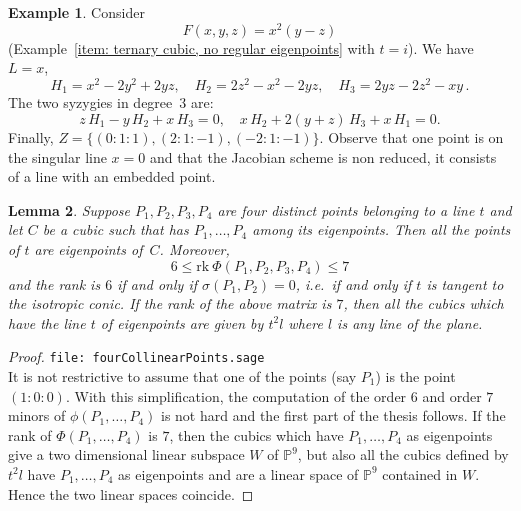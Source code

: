 \documentclass{amsart}
\theoremstyle{plain}
\newtheorem{lemma}{Lemma}[section]
\theoremstyle{definition}
\newtheorem{es}[lemma]{Example}
\newcommand{\p}{\mathbb{P}}
\newcommand{\rk}{\ensuremath{\mathrm{rk}}}
\begin{document}
\begin{es}
Consider
\[
 F(x, y, z) = x^2 (y - z)
\]
(Example~\eqref{item: ternary cubic, no regular eigenpoints} with $t=i$).
We have $L=x$,
\[
 H_1=x^2-2y^2+2y z, \quad H_2= 2z^2-x^2-2y z, \quad H_3= 2yz-2z^2-xy \,.
\]
The two syzygies in degree~$3$ are:
\[
z \, H_1 - y \, H_2 + x \, H_3 = 0, \quad x \, H_2 + 2(y+z) \, H_3 + x \, H_1 = 0.
\]
Finally, $Z= \{ (0:1:1),(2:1:-1),(-2:1:-1) \}$. Observe that one point is on the singular line $x=0$
and that the Jacobian scheme is non reduced, it consists of a line with an embedded point.
\end{es}

\begin{lemma}
\label{4ptiSuRetta2}
Suppose $P_1, P_2, P_3, P_4$ are four distinct points belonging to a line $t$
and let
$C$ be a cubic such that has $P_1, \dots, P_4$ among its eigenpoints. Then
all the points of $t$ are eigenpoints of~$C$. Moreover,
\begin{equation*}
6 \leq \rk  \  \Phi(P_1, P_2, P_3, P_4) \leq 7
\end{equation*}
and the rank is $6$ if and only if $\sigma(P_1, P_2) = 0$, i.e.\ if
and only if $t$ is tangent to the isotropic conic. If the rank of
the above matrix is $7$, then all the cubics which have the line $t$
of eigenpoints are given by $t^2l$ where $l$ is any line of the plane.
\end{lemma}
\begin{proof}
\verb+file: fourCollinearPoints.sage+\\
It is not restrictive to assume that one of the points (say $P_1$) is
the point $(1: 0: 0)$.
With this simplification, the computation of the order $6$ and order $7$
minors of $\phi(P_1, \dots, P_4)$ is not hard and
the first part of the thesis follows. If the rank of $\Phi(P_1, \dots, P_4)$
is $7$, then the cubics which have $P_1, \dots, P_4$ as eigenpoints
give a two dimensional linear subspace $W$ of $\p^9$, but also all
the cubics defined by $t^2l$ have $P_1, \dots, P_4$ as eigenpoints and are
a linear space of $\p^9$ contained in $W$. Hence the two linear
spaces coincide.
\end{proof}
\end{document}
